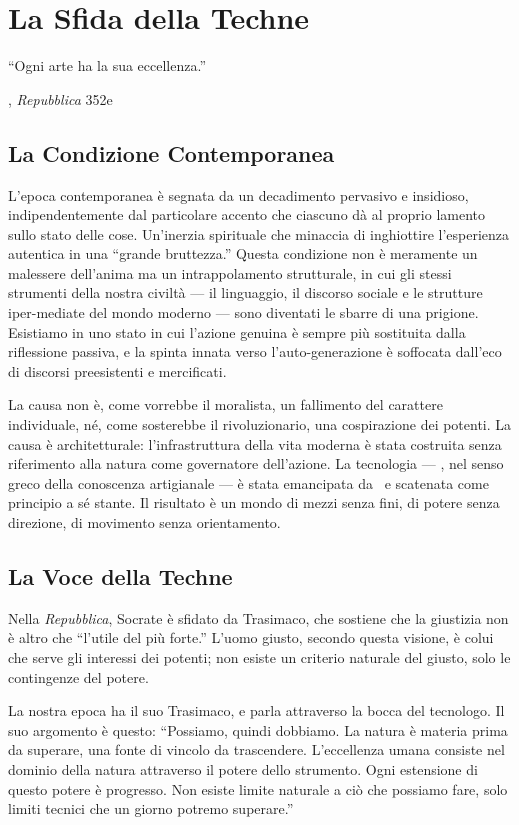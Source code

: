 \chapter{La Sfida della Techne}

\epigraph{``Ogni arte ha la sua eccellenza.''}{\textcite{plato1997complete}, \emph{Repubblica} 352e}

\section{La Condizione Contemporanea}

L'epoca contemporanea \`e segnata da un decadimento pervasivo e insidioso,
indipendentemente dal particolare accento che ciascuno d\`a al proprio lamento
sullo stato delle cose. Un'inerzia spirituale che minaccia di inghiottire
l'esperienza autentica in una ``grande bruttezza.'' Questa condizione non \`e
meramente un malessere dell'anima ma un intrappolamento strutturale, in cui
gli stessi strumenti della nostra civilt\`a --- il linguaggio, il discorso
sociale e le strutture iper-mediate del mondo moderno --- sono diventati le
sbarre di una prigione. Esistiamo in uno stato in cui l'azione genuina \`e
sempre pi\`u sostituita dalla riflessione passiva, e la spinta innata verso
l'auto-generazione \`e soffocata dall'eco di discorsi preesistenti e
mercificati.

La causa non \`e, come vorrebbe il moralista, un fallimento del carattere
individuale, n\'e, come sosterebbe il rivoluzionario, una cospirazione dei
potenti. La causa \`e architetturale: l'infrastruttura della vita moderna
\`e stata costruita senza riferimento alla natura come governatore
dell'azione. La tecnologia --- \techne, nel senso greco della conoscenza
artigianale --- \`e stata emancipata da \physis\ e scatenata come principio
a s\'e stante. Il risultato \`e un mondo di mezzi senza fini, di potere
senza direzione, di movimento senza orientamento.

\section{La Voce della Techne}

Nella \emph{Repubblica}, Socrate \`e sfidato da Trasimaco, che sostiene
che la giustizia non \`e altro che ``l'utile del pi\`u forte.'' L'uomo
giusto, secondo questa visione, \`e colui che serve gli interessi dei
potenti; non esiste un criterio naturale del giusto, solo le contingenze
del potere.

La nostra epoca ha il suo Trasimaco, e parla attraverso la bocca del
tecnologo. Il suo argomento \`e questo: ``Possiamo, quindi dobbiamo. La
natura \`e materia prima da superare, una fonte di vincolo da trascendere.
L'eccellenza umana consiste nel dominio della natura attraverso il potere
dello strumento. Ogni estensione di questo potere \`e progresso. Non esiste
limite naturale a ci\`o che possiamo fare, solo limiti tecnici che un
giorno potremo superare.''

